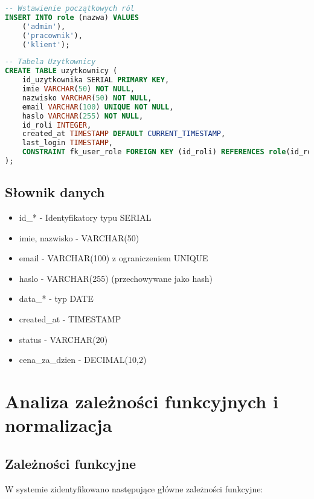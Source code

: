 \documentclass[12pt]{article}
\begin{document}
\begin{enumerate}
\begin{lstlisting}[language=SQL]
-- Wstawienie początkowych ról
INSERT INTO role (nazwa) VALUES
    ('admin'),
    ('pracownik'),
    ('klient');
\end{lstlisting}

\begin{lstlisting}[language=SQL]
-- Tabela Uzytkownicy
CREATE TABLE uzytkownicy (
    id_uzytkownika SERIAL PRIMARY KEY,
    imie VARCHAR(50) NOT NULL,
    nazwisko VARCHAR(50) NOT NULL,
    email VARCHAR(100) UNIQUE NOT NULL,
    haslo VARCHAR(255) NOT NULL,
    id_roli INTEGER,
    created_at TIMESTAMP DEFAULT CURRENT_TIMESTAMP,
    last_login TIMESTAMP,
    CONSTRAINT fk_user_role FOREIGN KEY (id_roli) REFERENCES role(id_roli)
);
\end{lstlisting}
\end{enumerate}
\subsection{Słownik danych}
\begin{itemize}
    \item id\_* - Identyfikatory typu SERIAL
    \item imie, nazwisko - VARCHAR(50)
    \item email - VARCHAR(100) z ograniczeniem UNIQUE
    \item haslo - VARCHAR(255) (przechowywane jako hash)
    \item data\_* - typ DATE
    \item created\_at - TIMESTAMP
    \item status - VARCHAR(20)
    \item cena\_za\_dzien - DECIMAL(10,2)
\end{itemize}

\section{Analiza zależności funkcyjnych i normalizacja}

\subsection{Zależności funkcyjne}
W systemie zidentyfikowano następujące główne zależności funkcyjne:
\end{document}
